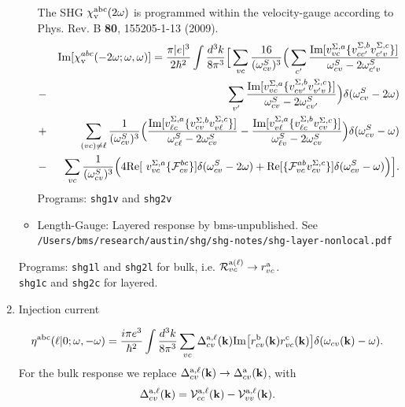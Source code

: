 \documentclass[12pt]{article}
\numberwithin{equation}{section}
\begin{document}
\begin{enumerate}
\begin{itemize}
The SHG $\chi_{\mathrm{v}}^{\mathrm{a}\mathrm{b}\mathrm{c}}(2\omega)$ is programmed within the velocity-gauge
 according to Phys.  Rev. B {\bf 80}, 155205-1-13 (2009).
\begin{eqnarray*}
&&\mbox{Im}\lbrack \chi _{\mathrm{v}}^{abc}(-2\omega;\omega,\omega)] 
=\frac{\pi
|e|^{3}}{2\hbar ^{2}}\int \frac{d^{3}k}{8\pi ^{3}}\Big[\sum_{vc}\frac{16}{(
\omega_{cv}^{S})^{3}}\Big(\sum_{c^{\prime }}\frac{\mbox{Im}\lbrack
v_{vc}^{\Sigma ,a}\{v_{cc^{\prime }}^{\Sigma ,b}v_{c^{\prime }v}^{\Sigma
,c}\}]}{\omega_{cv}^{S}-2\omega_{c^{\prime }v}^{S}}  \notag  \label{imchicf} \\
&-&\sum_{v^{\prime }}\frac{\mbox{Im}\lbrack v_{vc}^{\Sigma
,a}\{v_{cv^{\prime }}^{\Sigma ,b}v_{v^{\prime }v}^{\Sigma ,c}\}]}{\omega
_{cv}^{S}-2\omega_{cv^{\prime }}^{S}}\Big)\delta(\omega_{cv}^{S}-2\omega)  \notag \\
&+&\sum_{(vc)\neq\ell }\frac{1}{(\omega_{cv}^{S})^{3}}\Big(\frac{\mbox{Im}\lbrack
v_{\ell c}^{\Sigma ,a}\{v_{cv}^{\Sigma ,b}v_{v\ell }^{\Sigma ,c}\}]}{\omega
_{c\ell }^{S}-2\omega_{cv}^{S}}-\frac{\mbox{Im}\lbrack v_{v\ell }^{\Sigma
,a}\{v_{\ell c}^{\Sigma ,b}v_{cv}^{\Sigma ,c}\}]}{\omega_{\ell v}^{S}-2\omega
_{cv}^{S}}\Big)\delta(\omega_{cv}^{S}-\omega)  \notag \\
&-&\sum_{vc}\frac{1}{(\omega_{cv}^{S})^{3}}\Big(4\mbox{Re}\lbrack \
v_{vc}^{\Sigma ,a}\{\mathcal{F}_{cv}^{bc}\}]\delta(\omega_{cv}^{S}-2\omega)+\mbox{Re}
\lbrack \{\mathcal{F}_{vc}^{ab}v_{cv}^{\Sigma ,c}\}]\delta(\omega_{cv}^{S}-\omega)
\Big)\Big].
\end{eqnarray*}
Programs: \verb=shg1v= and \verb=shg2v=

\item Length-Gauge: 
Layered response by bms-unpublished. See\\
 \verb=/Users/bms/research/austin/shg/shg-notes/shg-layer-nonlocal.pdf=

\end{itemize}
Programs: \verb=shg1l= and \verb=shg2l= for bulk, i.e. ${\cal
  R}^{\mathrm{a}(\ell)}_{vc}\to r^{\mathrm{a}}_{vc}$.\\
\verb=shg1c= and \verb=shg2c= for layered.


\item Injection current  

\begin{equation}\label{etaell}
\eta^{\mathrm{a}\mathrm{b}\mathrm{c}}(\ell|0;\omega,-\omega)  
=
\frac{i\pi e^3}{\hbar^2}
\int\frac{d^3k}{8\pi^3}  
\sum_{vc}
\Delta_{cv}^{\mathrm{a},\ell}(\mathbf{k})  
\mathrm{Im}
\big[  
r^{\mathrm{b}}_{cv}(\mathbf{k})  
r^{\mathrm{c}}_{vc}(\mathbf{k})  
\big]
\delta(\omega_{cv}(\mathbf{k})-\omega)  
.  
\end{equation}  
For the bulk response we replace 
$\Delta_{cv}^{\mathrm{a},\ell}(\mathbf{k}) \to \Delta_{cv}^{\mathrm{a}}(\mathbf{k})$, with
\begin{align}\label{ic.1}
\Delta_{cv}^{\mathrm{a},\ell}(\mathbf{k}) 
={\cal V}_{cc}^{\mathrm{a},\ell}(\mathbf{k}) -{\cal V}_{vv}^{\mathrm{a},\ell}(\mathbf{k}) 
.
\end{align}


\end{enumerate}
\end{document}
